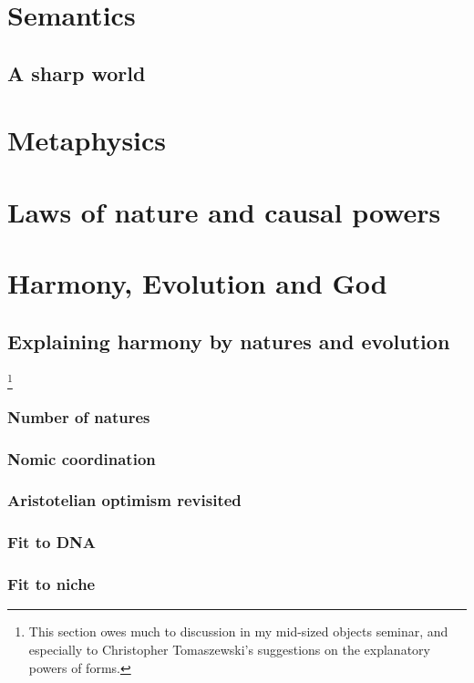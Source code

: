 \def\mychapter{VII}

\chapter{Semantics}\label{ch:semantics}
\section{A sharp world}
\chaptertail

\def\mychapter{VIII}

\chapter{Metaphysics}\label{ch:metaphysics}
\chaptertail 

\def\mychapter{IX}

\chapter{Laws of nature and causal powers}\label{ch:laws}
\chaptertail

\def\mychapter{X}

\chapter{Harmony, Evolution and God}\label{ch:God}
\section{Explaining harmony by natures and evolution}
\footnote{This section owes much to discussion in my mid-sized objects seminar, and especially to Christopher Tomaszewski's suggestions on the explanatory powers of forms.}
\subsection{Number of natures}
\subsection{Nomic coordination}
\subsection{Aristotelian optimism revisited}
\subsection{Fit to DNA}
\subsection{Fit to niche}
